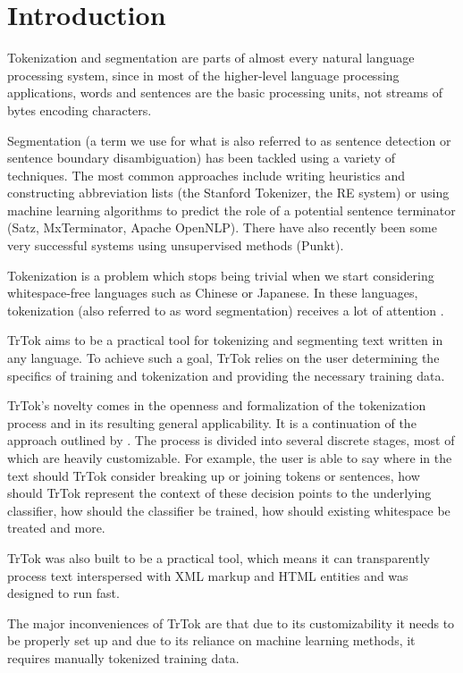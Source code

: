 \section{Introduction}
\label{sec:introduction}

Tokenization and segmentation are parts of almost every natural
language processing system, since in most of the higher-level language
processing applications, words and sentences are the basic processing
units, not streams of bytes encoding characters.

Segmentation (a term we use for what is also referred to as sentence
detection or sentence boundary disambiguation) has been tackled using
a variety of techniques. The most common approaches include writing
heuristics and constructing abbreviation lists (the Stanford
Tokenizer, the RE system) or using machine learning algorithms to
predict the role of a potential sentence terminator (Satz,
MxTerminator, Apache OpenNLP). There have also recently been some very
successful systems using unsupervised methods (Punkt).

Tokenization is a problem which stops being trivial when we start
considering whitespace-free languages such as Chinese or Japanese. In
these languages, tokenization (also referred to as word segmentation)
receives a lot of attention \cite{seg-bakeoff}.

TrTok aims to be a practical tool for tokenizing and segmenting text
written in any language. To achieve such a goal, TrTok relies on the
user determining the specifics of training and tokenization and
providing the necessary training data.

TrTok's novelty comes in the openness and formalization of the
tokenization process and in its resulting general applicability. It is
a continuation of the approach outlined by \cite{sbd-trtok-orig}. The
process is divided into several discrete stages, most of which are
heavily customizable. For example, the user is able to say where in
the text should TrTok consider breaking up or joining tokens or
sentences, how should TrTok represent the context of these decision
points to the underlying classifier, how should the classifier be
trained, how should existing whitespace be treated and more.

TrTok was also built to be a practical tool, which means it can
transparently process text interspersed with XML markup and HTML
entities and was designed to run fast.

The major inconveniences of TrTok are that due to its customizability
it needs to be properly set up and due to its reliance on machine
learning methods, it requires manually tokenized training data.
